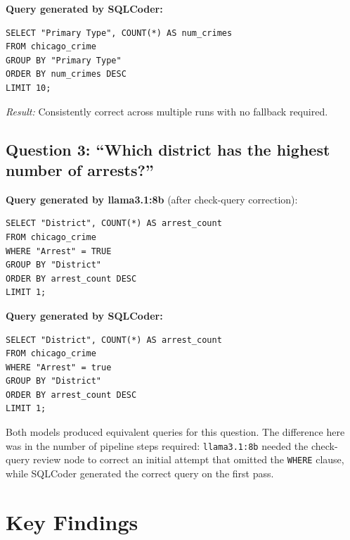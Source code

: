 \documentclass[12pt,a4paper]{article}
\begin{document}
\vspace{0.8em}
\noindent\textbf{Query generated by SQLCoder:}

\begin{lstlisting}[style=sql, caption={SQLCoder output for Question 2}]
SELECT "Primary Type", COUNT(*) AS num_crimes
FROM chicago_crime
GROUP BY "Primary Type"
ORDER BY num_crimes DESC
LIMIT 10;
\end{lstlisting}

\noindent\textit{Result:} Consistently correct across multiple runs with no
fallback required.

\vspace{1em}

\subsection{Question 3: ``Which district has the highest number of arrests?''}

\noindent\textbf{Query generated by llama3.1:8b} (after check-query correction):

\begin{lstlisting}[style=sql, caption={llama3.1:8b output for Question 3 (post check-query)}]
SELECT "District", COUNT(*) AS arrest_count
FROM chicago_crime
WHERE "Arrest" = TRUE
GROUP BY "District"
ORDER BY arrest_count DESC
LIMIT 1;
\end{lstlisting}

\noindent\textbf{Query generated by SQLCoder:}

\begin{lstlisting}[style=sql, caption={SQLCoder output for Question 3}]
SELECT "District", COUNT(*) AS arrest_count
FROM chicago_crime
WHERE "Arrest" = true
GROUP BY "District"
ORDER BY arrest_count DESC
LIMIT 1;
\end{lstlisting}

\noindent Both models produced equivalent queries for this question.  The difference
here was in the number of pipeline steps required: \texttt{llama3.1:8b} needed the
check-query review node to correct an initial attempt that omitted the
\texttt{WHERE} clause, while SQLCoder generated the correct query on the first pass.

\section{Key Findings}
\end{document}
